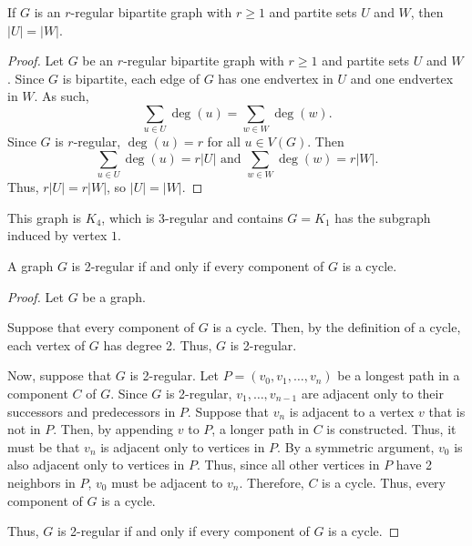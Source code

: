\documentclass[12pt]{article}
\begin{document}
 If $G$ is an $r$-regular bipartite graph with $r\geq 1$ and partite sets $U$ and $W$, then $|U| = |W|$.
\begin{proof}
Let $G$ be an $r$-regular bipartite graph with $r\geq 1$ and partite sets $U$ and $W$. Since $G$ is bipartite, each edge of $G$ has one endvertex in $U$ and one endvertex in $W$. As such, $$
\sum_{u\in U}\deg(u) = \sum_{w\in W}\deg(w).
$$
Since $G$ is $r$-regular, $\deg(u) = r$ for all $u \in V(G)$. Then
$$
\sum_{u\in U}\deg(u) = r|U|\text{  and  }\sum_{w\in W}\deg(w) = r|W|.
$$
Thus, $r|U| = r|W|$, so $|U| = |W|.$
\end{proof}
\bigskip{}
 This graph is $K_4$, which is $3$-regular and contains $G=K_1$ has the subgraph induced by vertex $1$.
\begin{center}
\end{center}
\newpage


 A graph $G$ is 2-regular if and only if every component of $G$ is a cycle.
\begin{proof}
    Let $G$ be a graph.

    Suppose that every component of $G$ is a cycle.
    Then, by the definition of a cycle, each vertex of $G$ has degree 2.
    Thus, $G$ is 2-regular.

    Now, suppose that $G$ is 2-regular.
    Let $P = (v_0, v_1, \hdots, v_n)$ be a longest path in a component $C$ of $G$.
    Since $G$ is 2-regular, $v_1, \hdots, v_{n-1}$ are adjacent only to their successors and predecessors in $P$.
    Suppose that $v_n$ is adjacent to a vertex $v$ that is not in $P$.
    Then, by appending $v$ to $P$, a longer path in $C$ is constructed.
    Thus, it must be that $v_n$ is adjacent only to vertices in $P$.
    By a symmetric argument, $v_0$ is also adjacent only to vertices in $P$.
    Thus, since all other vertices in $P$ have 2 neighbors in $P$, $v_0$ must be adjacent to $v_n$.
    Therefore, $C$ is a cycle.
    Thus, every component of $G$ is a cycle.

    Thus, $G$ is 2-regular if and only if every component of $G$ is a cycle.
\end{proof}
\end{document}
